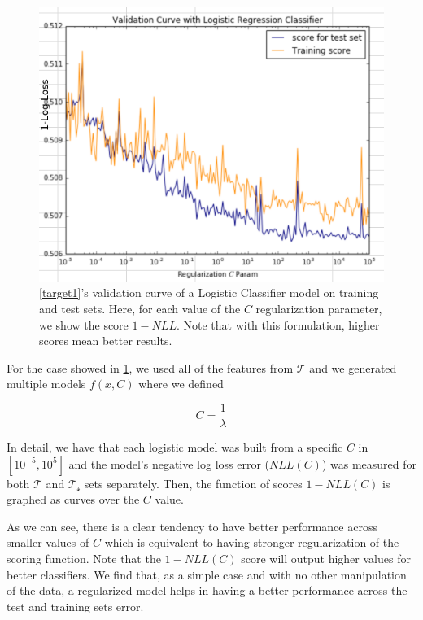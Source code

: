 
\begin{figure}[h!]
\begin{center}
\includegraphics[width=0.9\columnwidth]{figures/regularization/figure-log_loss_error_validation_curve.png}
\caption{ \cref{target1}'s validation curve of a Logistic Classifier model on training and test sets. Here, for each value of the $C$ regularization parameter, we show the score $1 - NLL$. Note that with this formulation, higher scores mean better results.}
\label{fig:log_loss_regularization_validation_curve}
\end{center}
\end{figure}

For the case showed in \cref{fig:log_loss_regularization_validation_curve}, we used all of the features from $\mathcal{T}$ and we generated multiple models $f(x,C)$ where we defined

$$C = \frac{1}{\lambda} $$

In detail, we have that each logistic model was built from a specific $C$ in  $[10^{-5},10^5]$  and the model's negative log loss error ($NLL(C)$) was measured for both $\mathcal{T}$ and $\mathcal{T_s}$ sets separately.
Then, the function of scores $1-NLL(C)$ is graphed as curves over the $C$ value.

As we can see, there is a clear tendency to have better performance across smaller values of $C$ which is equivalent to having stronger regularization of the scoring function.
Note that the $1-NLL(C)$ score will output higher values for better classifiers.
We find that, as a simple case and with no other manipulation of the data, a regularized model helps in having a better performance across the test and training sets error.


